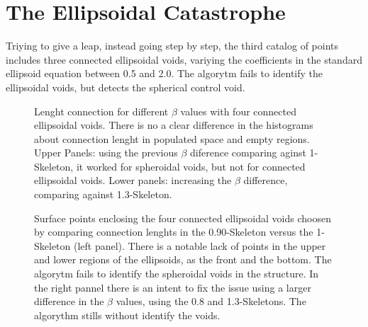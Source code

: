 \documentclass[preprint]{aastex62}
\begin{document}
\section{The Ellipsoidal Catastrophe}

Triying to give a leap, instead going step by step, the third catalog of points
includes three connected ellipsoidal voids, variying the coefficients in the
standard ellipsoid equation between 0.5 and 2.0. The algorytm fails to identify
the ellipsoidal voids, but detects the spherical control void.

\begin{figure}
  \caption{Lenght connection for different $\beta$ values with four
    connected ellipsoidal voids. There is no a clear difference in the histograms
    about connection lenght in populated space and empty regions.
    Upper Panels: using the previous $\beta$
    diference comparing aginst 1-Skeleton, it worked for spheroidal voids, but
    not for connected ellipsoidal voids.
    Lower panels: increasing the $\beta$ difference, comparing against 1.3-Skeleton.
    \label{Fig_Length_connection_Ellipsoids}}
\end{figure}


\begin{figure}
  \caption{Surface points enclosing the four connected ellipsoidal voids
    choosen by comparing connection lenghts in the 0.90-Skeleton versus the
    1-Skeleton (left panel). There is a notable lack of points in the upper
    and lower regions of the ellipsoids, as the front and the bottom. The algorytm
    fails to identify the spheroidal voids in the structure.
    In the right pannel there is an intent to fix the issue using a larger
    difference in the $\beta$ values, using the 0.8 and 1.3-Skeletons. The algorythm
    stills without identify the voids.
    \label{3d_scatter_four_voids}}
\end{figure}
\end{document}
